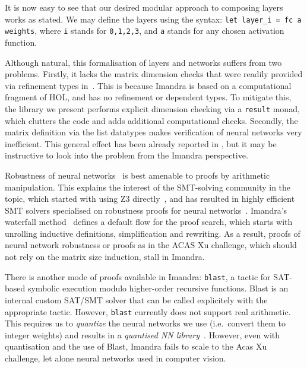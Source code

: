 \documentclass[runningheads]{llncs}
\begin{document}
  It is now easy to see that our desired modular approach to composing layers works as stated. We may define the layers using the syntax:
  \lstinline{let layer_i = fc a weights}, where \lstinline{i} stands for \lstinline{0,1,2,3}, and \lstinline{a} stands for any chosen activation function. 

  Although natural, this formalisation of layers and networks suffers from two problems.  Firstly, it lacks the matrix dimension checks that were readily provided  via refinement types in~\cite{KokkeKKAA20}. This is because Imandra is based on a computational fragment of HOL, and has no refinement or dependent types. To mitigate this, the library we present performs explicit dimension checking via a {\tt result} monad, which clutters the code and adds additional computational checks.
  Secondly, the matrix definition via the list datatypes makes verification of neural networks very inefficient.
  This general effect has been already reported in \cite{KokkeKKAA20}, but it may be instructive to look into the problem from the Imandra perspective.

   Robustness of neural networks~\cite{CKDKKAE22} is best amenable to proofs by arithmetic manipulation. This explains the interest of the SMT-solving community in the topic, which started with using Z3 directly~\cite{HuangKWW17}, and has resulted in highly efficient SMT solvers specialised on robustness proofs for neural networks~\cite{KaBaDiJuKo17Reluplex,KatzHIJLLSTWZDK19}.   Imandra's waterfall method~\cite{PassmoreCIABKKM20} defines a default flow for the proof search, which starts with unrolling inductive definitions, simplification and rewriting.
  As a result, proofs of neural network robustness or proofs as in the ACAS Xu challenge, which should not rely on the matrix size induction,
  stall in Imandra.

There is another mode of proofs available in Imandra:  \lstinline{blast}, a tactic for SAT-based symbolic execution modulo
higher-order recursive functions. Blast is an internal custom SAT/SMT solver that can be called explicitely with the appropriate tactic.
 However, \lstinline{blast} currently does not support real arithmetic. This
 requires us to \emph{quantize} the neural networks we use (i.e.\ convert them to
 integer weights) and results in a \emph{quantised NN library}~\cite{DPKD22}.
 However, even with quantisation and the use of Blast, Imandra fails to scale to the Acas Xu challenge, let alone neural networks used in computer vision.
\end{document}
